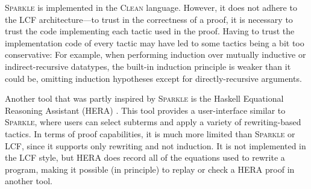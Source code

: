 \textsc{Sparkle} is implemented in the \textsc{Clean} language. However, it does not adhere to the LCF architecture---to trust in the correctness of a proof, it is necessary to trust the code implementing each tactic used in the proof. Having to trust the implementation code of every tactic may have led to some tactics being a bit too conservative: For example, when performing induction over mutually inductive or indirect-recursive datatypes, the built-in induction principle is weaker than it could be, omitting induction hypotheses except for directly-recursive arguments.

Another tool that was partly inspired by \textsc{Sparkle} is the Haskell Equational Reasoning Assistant (HERA) \cite{Gill06HERA}. This tool provides a user-interface similar to \textsc{Sparkle}, where users can select subterms and apply a variety of rewriting-based tactics. In terms of proof capabilities, it is much more limited than \textsc{Sparkle} or LCF, since it supports only rewriting and not induction. It is not implemented in the LCF style, but HERA does record all of the equations used to rewrite a program, making it possible (in principle) to replay or check a HERA proof in another tool.




